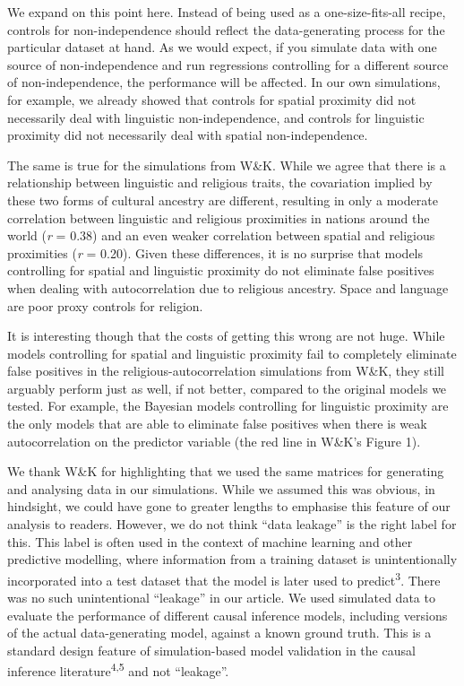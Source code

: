 \documentclass[
  11pt,
]{article}
\begin{document}
We expand on this point here. Instead of being used as a one-size-fits-all
recipe, controls for non-independence should reflect the data-generating process
for the particular dataset at hand. As we would expect, if you simulate data
with one source of non-independence and run regressions controlling for a
different source of non-independence, the performance will be affected. In our
own simulations, for example, we already showed that controls for spatial
proximity did not necessarily deal with linguistic non-independence, and
controls for linguistic proximity did not necessarily deal with spatial
non-independence.

The same is true for the simulations from W\&K. While we agree that there is a
relationship between linguistic and religious traits, the covariation implied by
these two forms of cultural ancestry are different, resulting in only a moderate
correlation between linguistic and religious proximities in nations around the
world (\emph{r} =
0.38)
and an even weaker correlation between spatial and religious proximities (\emph{r} =
0.20).
Given these differences, it is no surprise that models controlling for spatial
and linguistic proximity do not eliminate false positives when dealing with
autocorrelation due to religious ancestry. Space and language are poor proxy
controls for religion.

It is interesting though that the costs of getting this wrong are not huge.
While models controlling for spatial and linguistic proximity fail to
completely eliminate false positives in the religious-autocorrelation
simulations from W\&K, they still arguably perform just as well, if not better,
compared to the original models we tested. For example, the Bayesian models
controlling for linguistic proximity are the only models that are able to
eliminate false positives when there is weak autocorrelation on the predictor
variable (the red line in W\&K's Figure 1).

We thank W\&K for highlighting that we used the same matrices for generating and
analysing data in our simulations. While we assumed this was obvious, in
hindsight, we could have gone to greater lengths to emphasise this feature of
our analysis to readers. However, we do not think ``data leakage'' is the right
label for this. This label is often used in the context of machine learning and
other predictive modelling, where information from a training dataset is
unintentionally incorporated into a test dataset that the model is later used to
predict\textsuperscript{3}. There was no such unintentional ``leakage'' in our article.
We used simulated data to evaluate the performance of different causal inference
models, including versions of the actual data-generating model, against a known
ground truth. This is a standard design feature of simulation-based model
validation in the causal inference literature\textsuperscript{4,5} and not
``leakage''.
\end{document}
